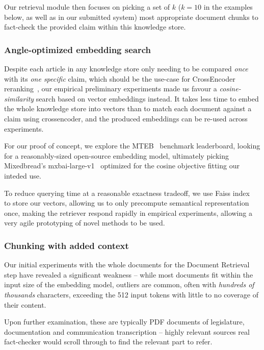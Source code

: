Our retrieval module then focuses on picking a set of $k$ ($k=10$ in the examples below, as well as in our submitted system) most appropriate document chunks to fact-check the provided claim within this knowledge store.

\subsubsection{Angle-optimized embedding search}
\label{sec:knn}
Despite each article in any knowledge store only needing to be compared \textit{once} with its \textit{one specific} claim, which should be the use-case for CrossEncoder reranking~\cite{dejean2024thoroughcomparisoncrossencodersllms}, our empirical preliminary experiments made us favour a \textit{cosine-similarity} search based on vector embeddings instead.
It takes less time to embed the whole knowledge store into vectors than to match each document against a claim using crossencoder, and the produced embeddings can be re-used across experiments.

For our proof of concept, we explore the MTEB~\cite{muennighoff-etal-2023-mteb} benchmark leaderboard, looking for a reasonably-sized open-source embedding model, ultimately picking Mixedbread's mxbai-large-v1~\cite{li-li-2024-aoe,emb2024mxbai} optimized for the cosine objective fitting our inteded use.

{To reduce querying time at a reasonable exactness tradeoff, we use Faiss index~\cite{douze2024faiss,johnson2019billion} to store our vectors, allowing us to only precompute semantical representation once, making the retriever respond rapidly in empirical experiments, allowing a very agile prototyping of novel methods to be used.}
\
\subsubsection{Chunking with added context}
Our initial experiments with the whole \averitec{}  documents for the Document Retrieval step have revealed a significant weakness -- while most documents fit within the input size of the embedding model, outliers are common, often with \textit{hundreds of thousands} characters, exceeding the 512 input tokens with little to no coverage of their content.

Upon further examination, these are typically PDF documents of legislature, documentation and communication transcription -- highly relevant sources real fact-checker would scroll through to find the relevant part to refer. 

